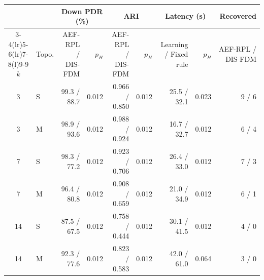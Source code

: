 \begin{tabular}{@{}clrrrrrrr@{}}
\toprule
 & & \multicolumn{2}{c}{Down PDR (\%)} & \multicolumn{2}{c}{ARI} & \multicolumn{2}{c}{Latency (s)} & Recovered\\
\cmidrule(lr){3-4}\cmidrule(lr){5-6}\cmidrule(lr){7-8}\cmidrule(l){9-9}
$k$ & Topo. & AEF-RPL / DIS-FDM & $p_H$ & AEF-RPL / DIS-FDM & $p_H$ & Learning / Fixed rule & $p_H$ & AEF-RPL / DIS-FDM\\
\midrule
3 & S & 99.3 / 88.7 & 0.012 & 0.966 / 0.850 & 0.012 & 25.5 / 32.1 & 0.023 & 9 / 6 \\
3 & M & 98.9 / 93.6 & 0.012 & 0.988 / 0.924 & 0.012 & 16.7 / 32.7 & 0.012 & 6 / 4 \\
7 & S & 98.3 / 77.2 & 0.012 & 0.923 / 0.706 & 0.012 & 26.4 / 33.0 & 0.012 & 7 / 3 \\
7 & M & 96.4 / 80.8 & 0.012 & 0.908 / 0.659 & 0.012 & 21.0 / 34.9 & 0.012 & 6 / 1 \\
14 & S & 87.5 / 67.5 & 0.012 & 0.758 / 0.444 & 0.012 & 30.1 / 41.5 & 0.012 & 4 / 0 \\
14 & M & 92.3 / 77.6 & 0.012 & 0.823 / 0.583 & 0.012 & 42.0 / 61.0 & 0.064 & 3 / 0 \\
\bottomrule
\end{tabular}
